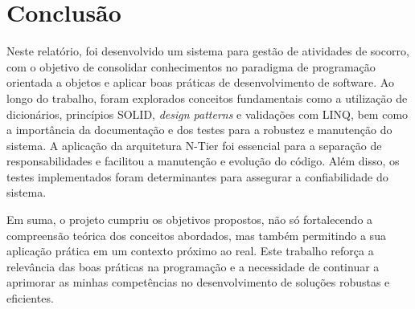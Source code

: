 \documentclass[11pt]{scrartcl} %
\begin{document}
\newpage
\section{Conclusão}
Neste relatório, foi desenvolvido um sistema para gestão de atividades de socorro, com o objetivo de consolidar conhecimentos no paradigma de programação orientada a objetos e aplicar boas práticas de desenvolvimento de software. Ao longo do trabalho, foram explorados conceitos fundamentais como a utilização de dicionários, princípios SOLID, \textit{design patterns} e validações com LINQ, bem como a importância da documentação e dos testes para a robustez e manutenção do sistema. A aplicação da arquitetura N-Tier foi essencial para a separação de responsabilidades e facilitou a manutenção e evolução do código. Além disso, os testes implementados foram determinantes para assegurar a confiabilidade do sistema.

Em suma, o projeto cumpriu os objetivos propostos, não só fortalecendo a compreensão teórica dos conceitos abordados, mas também permitindo a sua aplicação prática em um contexto próximo ao real. Este trabalho reforça a relevância das boas práticas na programação e a necessidade de continuar a aprimorar as minhas competências no desenvolvimento de soluções robustas e eficientes.
\end{document}
